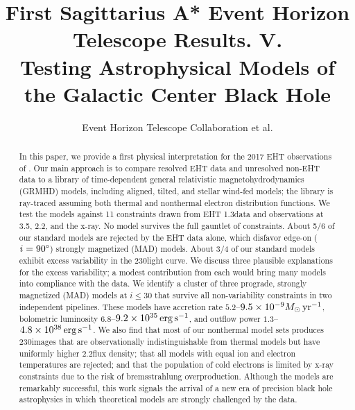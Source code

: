\documentclass[twocolumn,twocolappendix,tighten,dvipsnames,linenumbers]{aastex63}
\begin{document}
\title{First Sagittarius A* Event Horizon Telescope Results. V.\\
  Testing Astrophysical Models of the Galactic Center Black Hole}

%
\author{Event Horizon Telescope Collaboration et al.}


\received{\today}
\revised{\today}

\begin{abstract}

  In this paper, we provide a first physical interpretation for the 2017 EHT observations of \sgra.  Our main approach is to compare resolved EHT data and unresolved non-EHT data to a library of time-dependent general relativistic magnetohydrodynamics (GRMHD) models, including aligned, tilted, and stellar wind-fed models; the library is ray-traced assuming both thermal and nonthermal electron distribution functions. We test the models against 11 constraints drawn from EHT 1.3\mm data and observations at 3.5\mm, 2.2\um, and the x-ray.  No model survives the full gauntlet of constraints. About 5/6 of our standard models are rejected by the EHT data alone, which disfavor edge-on ($i = 90\degree$) strongly magnetized (MAD) models.  About 3/4 of our standard models exhibit excess variability in the 230\GHz light curve.  We discuss three plausible explanations for the excess variability; a modest contribution from each would bring many models into compliance with the data.  We identify a cluster of three prograde, strongly magnetized (MAD) models at $i \le 30$ that survive all non-variability constraints in two independent pipelines.  These models have accretion rate $5.2$--$9.5\times10^{-9}M_\odot\,\mathrm{yr}^{-1}$, bolometric luminosity $6.8$--$9.2\times10^{35}\,\mathrm{erg\,s^{-1}}$, and outflow power $1.3$--$4.8\times10^{38}\,\mathrm{erg\,s^{-1}}$.  We also find that most of our nonthermal model sets produces 230\GHz images that are observationally indistinguishable from thermal models but have uniformly higher 2.2\um flux density; that all models with equal ion and electron temperatures are rejected; and that the population of cold electrons is limited by x-ray constraints due to the risk of bremsstrahlung overproduction.  Although the models are remarkably successful, this work signals the arrival of a new era of precision black hole astrophysics in which theoretical models are strongly challenged by the data.
  
\end{abstract}
\end{document}

